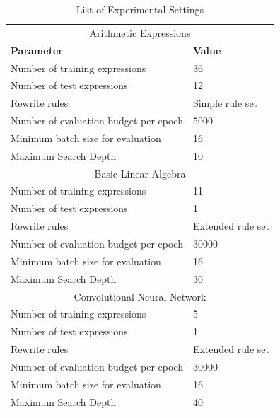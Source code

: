 \documentclass[fullpage,twocolumn]{article} %
\begin{document}
\begin{table}
    \centering
    \caption{List of Experimental Settings}
    \begin{tabular}{ll}
      \toprule
      \multicolumn{2}{c}{Arithmetic Expressions} \\
      {\bf Parameter}                              &  {\bf Value} \\ \midrule
      Number of training expressions               & 36 \\
      Number of test expressions                   & 12 \\
      Rewrite rules                                & Simple rule set \\
      Number of evaluation budget per epoch        & 5000 \\
      Minimum batch size for evaluation            & 16 \\
      Maximum Search Depth                         & 10 \\
      \multicolumn{2}{c}{Basic Linear Algebra} \\ \midrule
      Number of training expressions               & 11 \\
      Number of test expressions                   & 1 \\
      Rewrite rules                                & Extended rule set \\
      Number of evaluation budget per epoch        & 30000 \\
      Minimum batch size for evaluation            & 16 \\
      Maximum Search Depth                         & 30 \\
      \multicolumn{2}{c}{Convolutional Neural Network} \\ \midrule
      Number of training expressions               & 5 \\
      Number of test expressions                   & 1 \\
      Rewrite rules                                & Extended rule set \\
      Number of evaluation budget per epoch        & 30000 \\
      Minimum batch size for evaluation            & 16 \\
      Maximum Search Depth                         & 40 \\ \midrule
      
      \bottomrule
    \end{tabular}
    \label{tbl:benchmarks}
  \end{table}
\end{document}
